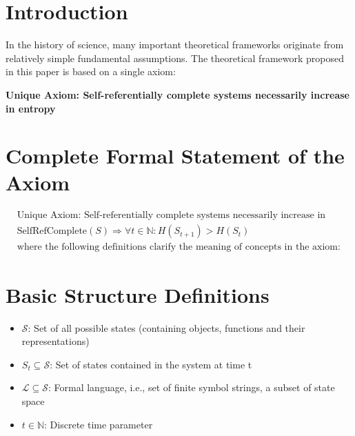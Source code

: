 \section{Introduction}
\label{sec:ch01_axiom_and_derivation:introduction}

In the history of science, many important theoretical frameworks originate from relatively simple fundamental assumptions. The theoretical framework proposed in this paper is based on a single axiom:

\textbf{Unique Axiom: Self-referentially complete systems necessarily increase in entropy}

\section{Complete Formal Statement of the Axiom}
\label{sec:ch01_axiom_and_derivation:complete-formal-statement-of-the-axiom}

\begin{tcolorbox}[colback=gray!10,colframe=black]
\begin{equation*}
\begin{aligned}
&\text{Unique Axiom: Self-referentially complete systems necessarily increase in entropy} \\
&\text{SelfRefComplete}(S) \Rightarrow \forall t \in \mathbb{N}: H(S_{t+1}) > H(S_t) \\
&\text{where the following definitions clarify the meaning of concepts in the axiom:}
\end{aligned}
\end{equation*}
\end{tcolorbox}

\section{Basic Structure Definitions}
\label{sec:ch01_axiom_and_derivation:basic-structure-definitions-clarification-of-concepts-in-the-axiom}

\begin{itemize}
\item $\mathcal{S}$: Set of all possible states (containing objects, functions and their representations)
\item $S_t \subseteq \mathcal{S}$: Set of states contained in the system at time t
\item $\mathcal{L} \subseteq \mathcal{S}$: Formal language, i.e., set of finite symbol strings, a subset of state space
\item $t \in \mathbb{N}$: Discrete time parameter
\end{itemize}

